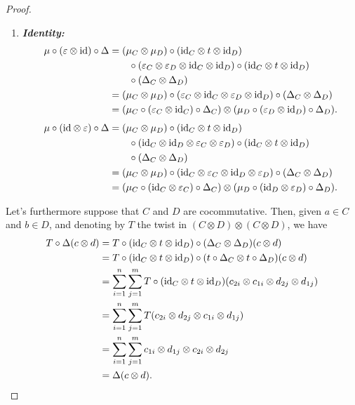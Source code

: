 \begin{proof}
\begin{enumerate}[-]
    \item \textbf{\textit{Identity:}}
    \begin{align*}
        \mu\circ(\varepsilon\otimes\text{\rm id})\circ\Delta
            &= (\mu_C\otimes\mu_D)\circ(\text{\rm id}_C\otimes t\otimes\text{\rm id}_D)\\
            &\qquad\circ(\varepsilon_C\otimes\varepsilon_D
                    \otimes\text{\rm id}_C\otimes\text{\rm id}_D)
                \circ(\text{\rm id}_C\otimes t\otimes\text{\rm id}_D)\\
            &\qquad\circ(\Delta_C\otimes\Delta_D)\\
            &= (\mu_C\otimes\mu_D)
                \circ(\varepsilon_C\otimes\text{\rm id}_C
                \otimes\varepsilon_D\otimes\text{\rm id}_D)
                \circ(\Delta_C\otimes\Delta_D)\\
            &= (\mu_C\circ(\varepsilon_C\otimes\text{\rm id}_C)\circ\Delta_C)
                \otimes
                (\mu_D\circ(\varepsilon_D\otimes\text{\rm id}_D)\circ\Delta_D).
    \end{align*}
    \begin{align*}        
        \mu\circ(\text{\rm id}\otimes\varepsilon)\circ\Delta
            &= (\mu_C\otimes\mu_D)\circ(\text{\rm id}_C\otimes t\otimes\text{\rm id}_D)\\
            &\qquad\circ(\text{\rm id}_C\otimes\text{\rm id}_D\otimes
                    \varepsilon_C\otimes\varepsilon_D)
                \circ(\text{\rm id}_C\otimes t\otimes\text{\rm id}_D)\\
            &\qquad\circ(\Delta_C\otimes\Delta_D)\\
            &= (\mu_C\otimes\mu_D)
                \circ(\text{\rm id}_C\otimes\varepsilon_C\otimes
                    \text{\rm id}_D\otimes\varepsilon_D)
                    \circ(\Delta_C\otimes\Delta_D)\\
            &= (\mu_C\circ(\text{\rm id}_C\otimes\varepsilon_C)\circ\Delta_C)
                \otimes
                (\mu_D\circ(\text{\rm id}_D\otimes\varepsilon_D)\circ\Delta_D).
    \end{align*}
    \normalsize
    \end{enumerate}
    Let's furthermore suppose that $C$ and $D$ are cocommutative. Then, given $a\in C$ and $b\in D$, and denoting by $T$ the twist in $(C\otimes D)\otimes(C\otimes D)$, we have
    \begin{align*}
        T\circ\Delta(c\otimes d)
            &= T\circ(\text{\rm id}_C\otimes t\otimes\text{\rm id}_D)
                \circ(\Delta_C\otimes\Delta_D)(c\otimes d)\\
            &= T\circ(\text{\rm id}_C\otimes t\otimes\text{\rm id}_D)
                \circ(t\circ\Delta_C\otimes t\circ\Delta_D)(c\otimes d)\\
            &= \sum_{i=1}^n\sum_{j=1}^m
                T\circ(\text{\rm id}_C\otimes t\otimes\text{\rm id}_D)
                (c_{2i}\otimes c_{1i}\otimes d_{2j}\otimes d_{1j})\\
            &= \sum_{i=1}^n\sum_{j=1}^m
                T(c_{2i}\otimes d_{2j}\otimes c_{1i}\otimes d_{1j})\\
            &= \sum_{i=1}^n\sum_{j=1}^m
                c_{1i}\otimes d_{1j}\otimes c_{2i}\otimes d_{2j}\\
            &= \Delta(c\otimes d).
    \end{align*}
\end{proof}



